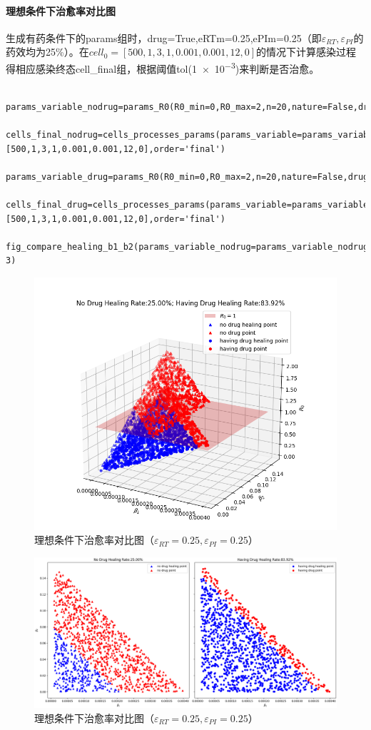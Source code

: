 \documentclass{ctexart}
\begin{document}
    \paragraph{理想条件下治愈率对比图}
    生成有药条件下的params组时，drug=True,eRTm=0.25,ePIm=0.25（即$\varepsilon _{RT},\varepsilon _{PI}$的药效均为25\%）。在$cell_{0}=[500,1,3,1,0.001,0.001,12,0]$的情况下计算感染过程得相应感染终态cell\_final组，根据阈值tol(\num{1e-3})来判断是否治愈。
    \begin{lstlisting}
    params_variable_nodrug=params_R0(R0_min=0,R0_max=2,n=20,nature=False,drug=False)
    cells_final_nodrug=cells_processes_params(params_variable=params_variable_nodrug,cell0=[500,1,3,1,0.001,0.001,12,0],order='final')
    params_variable_drug=params_R0(R0_min=0,R0_max=2,n=20,nature=False,drug=True,eRTm=0.25,ePIm=0.25)
    cells_final_drug=cells_processes_params(params_variable=params_variable_drug,cell0=[500,1,3,1,0.001,0.001,12,0],order='final')
    fig_compare_healing_b1_b2(params_variable_nodrug=params_variable_nodrug,cells_final_nodrug=cells_final_nodrug,params_variable_drug=params_variable_drug,cells_final_drug=cells_final_drug,tol=1e-3)
\end{lstlisting}
    \begin{figure}[H]
        \centering
        \includegraphics[width=0.8\linewidth]{6.1.1.png}
        \caption{理想条件下治愈率对比图（$\varepsilon _{RT}=0.25,\varepsilon _{PI}=0.25$）}
        \label{fig.6.1.1}
    \end{figure}
    \begin{figure}[H]
        \centering
        \includegraphics[width=\linewidth]{6.1.2.png}
        \caption{理想条件下治愈率对比图（$\varepsilon _{RT}=0.25,\varepsilon _{PI}=0.25$）}
        \label{fig.6.1.2}
    \end{figure}
\end{document}
